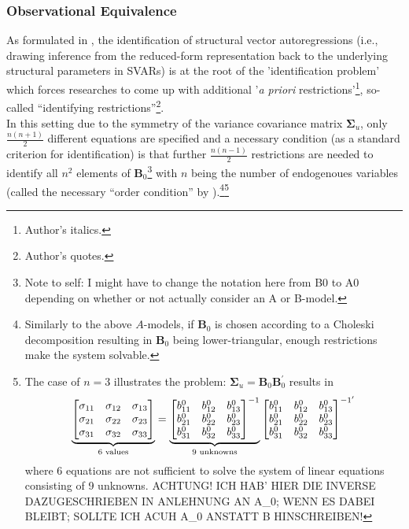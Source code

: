 \documentclass[a4paper,11pt,listof=nochaptergap,oneside,pointednumbers,bibtotoc,bigheadings,liststotoc]{scrbook}
\theoremstyle{mysatz}
\theoremstyle{mydefinition}
\theoremstyle{mybemerkung}
\renewcommand*{\paragraph}[1]{\subsubsection*{#1} \vspace{-3mm}} %
\newcommand{\vect}[1]{\boldsymbol{\mathbf{#1}}}
\begin{document}
\paragraph{Observational Equivalence}
As formulated in \citet{rubioetal:10}, the identification of structural vector autoregressions (i.e., drawing inference from the reduced-form representation back to the underlying structural parameters in SVARs) is at the root of the 'identification problem' which forces researches to come up with additional '\textit{a priori} restrictions'\footnote{Author's italics.}, so-called ``identifying restrictions''\footnote{Author's quotes.}.\\
In this setting due to the symmetry of the variance covariance matrix $\vect{\Sigma}_u$, only $\frac{n(n+1)}{2}$ different equations are specified and a necessary condition (as a standard criterion for identification) is that further $\frac{n(n-1)}{2}$ restrictions are needed to identify all $n^2$ elements of $\vect{B}_0$\footnote{Note to self: I might have to change the notation here from B0 to A0 depending on whether or not \citet{ludvigsonetal:18} actually consider an A or B-model.} with $n$ being the number of endogenoues variables (called the necessary ``order condition'' by \citealp{rothenberg:71}).\footnote{Similarly to the above $A$-models, if $\vect{B}_0$ is chosen according to a Choleski decomposition resulting in $\vect{B}_0$ being lower-triangular, enough restrictions make the system solvable.}\footnote{The case of $n=3$ illustrates the problem: $\vect{\Sigma}_u = \vect{B}_0 \vect{B}_0^'$ results in $$		
		\underbrace{%
		\begin{bmatrix}
    		\sigma_{11} & \sigma_{12} & \sigma_{13} \\
		\sigma_{21} & \sigma_{22} & \sigma_{23} \\
		\sigma_{31} & \sigma_{32} & \sigma_{33}
 		\end{bmatrix}
}_{\text{6 values}} = \underbrace{%
		\begin{bmatrix}
    		b_{11}^0 & b_{12}^0 & b_{13}^0 \\
		b_{21}^0 & b_{22}^0 & b_{23}^0 \\
		b_{31}^0 & b_{32}^0 & b_{33}^0
 		\end{bmatrix}^{-1}
}_{\text{9 unknowns}}
\begin{bmatrix}
    		b_{11}^0 & b_{12}^0 & b_{13}^0 \\
		b_{21}^0 & b_{22}^0 & b_{23}^0 \\
		b_{31}^0 & b_{32}^0 & b_{33}^0
 		\end{bmatrix}^{{-1}'}$$ 
		where 6 equations are not sufficient to solve the system of linear equations consisting of 9 unknowns. ACHTUNG! ICH HAB' HIER DIE INVERSE DAZUGESCHRIEBEN IN ANLEHNUNG AN A_0; WENN ES DABEI BLEIBT; SOLLTE ICH ACUH A_0 ANSTATT B HINSCHREIBEN!}\\
\end{document}
